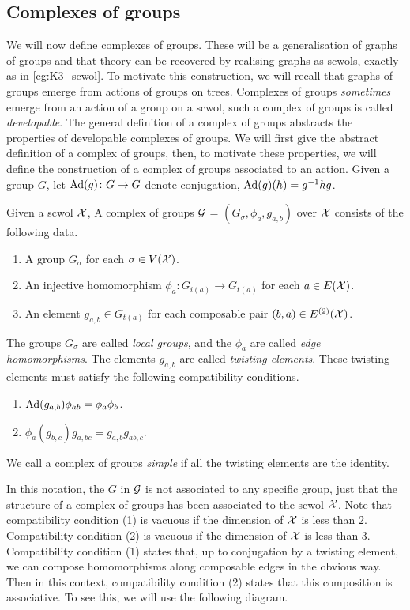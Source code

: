 \subsection{Complexes of groups}
We will now define complexes of groups.
These will be a generalisation of graphs of groups and that theory can be recovered by realising graphs as scwols, exactly as in \cref{eg:K3_scwol}.
To motivate this construction, we will recall that graphs of groups emerge from actions of groups on trees.
Complexes of groups \emph{sometimes} emerge from an action of a group on a scwol, such a complex of groups is called \emph{developable}.
The general definition of a complex of groups abstracts the properties of developable complexes of groups.
We will first give the abstract definition of a complex of groups, then, to motivate these properties, we will define the construction of a complex of groups associated to an action.
Given a group $G$, let $\operatorname{Ad}(g) \colon G \to G$ denote conjugation, $\operatorname{Ad}(g)(h) = g^{-1}hg$.

\begin{definition}
	Given a scwol $\mathcal{X}$, A complex of groups $\mathcal{G}$ = $(G_\sigma, \phi_a, g_{a,b})$ over $\mathcal{X}$ consists of the following data.
	\begin{enumerate}
		\item A group $G_\sigma$ for each $\sigma \in V(\mathcal{X})$.
		\item An injective homomorphism $\phi_a \colon G_{i(a)} \to G_{t(a)}$ for each $a \in E(\mathcal{X})$.
		\item An element $g_{a,b} \in G_{t(a)}$ for each composable pair $(b,a) \in E^{(2)}(\mathcal{X})$.
	\end{enumerate}
	The groups $G_\sigma$ are called \emph{local groups}, and the $\phi_a$ are called \emph{edge homomorphisms}.
	The elements $g_{a,b}$ are called \emph{twisting elements}.
	These twisting elements must satisfy the following compatibility conditions.
	\begin{enumerate}
		\item $\operatorname{Ad}(g_{a,b}) \phi_{ab} = \phi_a \phi_b$.
		\item $\phi_a(g_{b,c})g_{a,bc} = g_{a,b}g_{ab,c}$.
	\end{enumerate}
	We call a complex of groups \emph{simple} if all the twisting elements are the identity.
	\label{def:complex_of_groups}
\end{definition}

In this notation, the $G$ in $\mathcal{G}$ is not associated to any specific group, just that the structure of a complex of groups has been associated to the scwol $\mathcal{X}$.
Note that compatibility condition (1) is vacuous if the dimension of $\mathcal{X}$ is less than 2.
Compatibility condition (2) is vacuous if the dimension of  $\mathcal{X}$ is less than 3.
Compatibility condition (1) states that, up to conjugation by a twisting element, we can compose homomorphisms along composable edges in the obvious way.
Then in this context, compatibility condition (2) states that this composition is associative.
To see this, we will use the following diagram.

